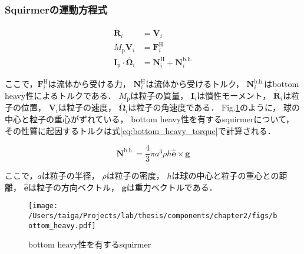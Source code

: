 \subsubsection{Squirmerの運動方程式}
\label{sec:equation_of_motion}
    \begin{align}
        \dot{\boldsymbol{R}_i} &= \boldsymbol{V}_i \\
        M_\mathrm{p} \dot{\boldsymbol{V}_i} &= \boldsymbol{F}^\mathrm{H}_i \\
        \boldsymbol{I}_\mathrm{p} \cdot \dot{\boldsymbol{\Omega}_i} &=
            \boldsymbol{N}^\mathrm{H}_i + \boldsymbol{N}^\mathrm{b.h.}_i
    \end{align}

\noindent
ここで，$\boldsymbol{F}^\mathrm{H}_i$は流体から受ける力，
$\boldsymbol{N}^\mathrm{H}_i$は流体から受けるトルク，
$\boldsymbol{N}^\mathrm{b.h.}_i$はbottom heavy性によるトルクである．
$M_\mathrm{p}$は粒子の質量，
$\boldsymbol{I}_i$は慣性モーメント，
$\dot{\boldsymbol{R}_i}$は粒子の位置，
$\boldsymbol{V}_i$は粒子の速度，
$\dot{\boldsymbol{\Omega}_i}$は粒子の角速度である．
Fig.\ref{fig:bottom_heaviness}のように，
球の中心と粒子の重心がずれている，
bottom heavy性を有するsquirmerについて，
その性質に起因するトルクは式\eqref{eq:bottom_heavy_torque}で計算される\cite{dilute_squirmer}．

    \begin{equation}
        \boldsymbol{N}^\mathrm{b.h.} = \frac{4}{3} \pi a^3 \rho h \boldsymbol{\hat{e}} \times \boldsymbol{g}
        \label{eq:bottom_heavy_torque}
    \end{equation}

\noindent
ここで，$a$は粒子の半径，
$\rho$は粒子の密度，
$h$は球の中心と粒子の重心との距離，
$\boldsymbol{\hat{e}}$は粒子の方向ベクトル，
$\boldsymbol{g}$は重力ベクトルである．

    \begin{figure}[htbp]
        \centering
        \texttt{[image: /Users/taiga/Projects/lab/thesis/components/chapter2/figs/bottom\_heavy.pdf]}
        \caption{bottom heavy性を有するsquirmer}
        \label{fig:bottom_heaviness}
    \end{figure}
